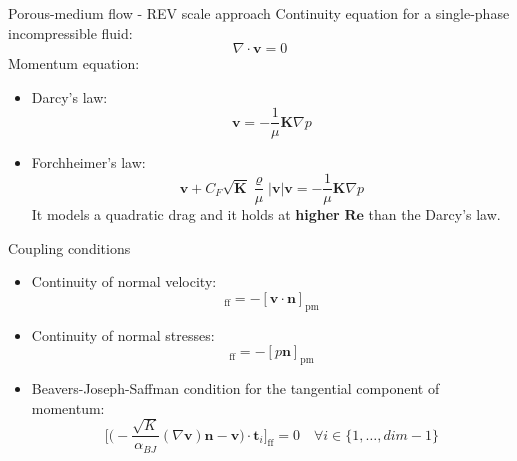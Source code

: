 \documentclass{beamer}
\begin{document}
\begin{frame}{Porous-medium flow - REV scale approach}
Continuity equation for a single-phase incompressible fluid:
\begin{equation*}
\nabla \cdot \mathbf{v} = 0
\end{equation*}
Momentum equation:
\begin{itemize}
	\item Darcy's law:
\begin{equation*}
	\mathbf{v} = -\frac{1}{\mu}\mathbf{K} \nabla p
\end{equation*}
	\item Forchheimer's law:
	\begin{equation*}
	\mathbf{v} + C_F \sqrt{\mathbf{K}} \frac{\varrho}{\mu} |\mathbf{v}| 
	\mathbf{v} = - \frac{1}{\mu}\mathbf{K} \nabla p
	\end{equation*}
	It models a quadratic drag and it holds at \textbf{higher} 
	$\boldsymbol{Re}$ than the Darcy's law.
\end{itemize}
\end{frame}
\begin{frame}{Coupling conditions}
\begin{itemize}
	\item Continuity of normal velocity:
	\begin{equation*}
	[\mathbf{v} \cdot \mathbf{n}]_\text{ff} = - [\mathbf{v} 
	\cdot \mathbf{n}]_\text{pm}
	\end{equation*}
	\item Continuity of normal stresses:
	\begin{equation*}
	[(\varrho \mathbf{v} \mathbf{v}^\mathrm{T} - (\mu + \mu_t) \nabla 
	\mathbf{v} + p\mathbf{I}) 
	\mathbf{n}]_\text{ff} = 
	- [p\mathbf{n}]_\text{pm}
	\end{equation*}
	\item Beavers-Joseph-Saffman condition for the tangential component of 
	momentum:
	\begin{equation*}
	\bigg[ \bigg( -\frac{\sqrt{K}}{\alpha_{BJ}} (\nabla \mathbf{v}) 
	\mathbf{n} - \mathbf{v} \bigg) \cdot \mathbf{t}_i \bigg]_\text{ff} = 0 
	\quad \forall i \in \{1, \dots, dim - 1\}
	\end{equation*}
\end{itemize}
\end{frame}
\end{document}
